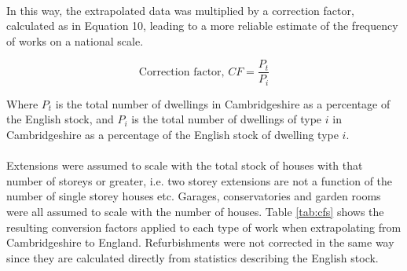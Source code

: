 \documentclass[12pt]{article}
\begin{document}
\paragraph{}
In this way, the extrapolated data was multiplied by a correction factor, calculated as in Equation 10, leading to a more reliable estimate of the frequency of works on a national scale.

\begin{equation}
    \text{Correction factor, } CF = \frac{P_t}{P_i}
\end{equation}

\noindent
Where $P_t$ is the total number of dwellings in Cambridgeshire as a percentage of the English stock, and $P_i$ is the total number of dwellings of type $i$ in Cambridgeshire as a percentage of the English stock of dwelling type $i$.

\paragraph{}
Extensions were assumed to scale with the total stock of houses with that number of storeys or greater, i.e. two storey extensions are not a function of the number of single storey houses etc. Garages, conservatories and garden rooms were all assumed to scale with the number of houses. Table \ref{tab:cfs} shows the resulting conversion factors applied to each type of work when extrapolating from Cambridgeshire to England. Refurbishments were not corrected in the same way since they are calculated directly from statistics describing the English stock.
\end{document}
